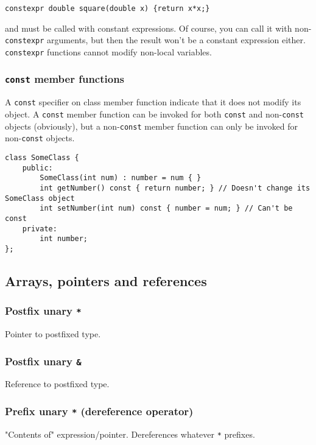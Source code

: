 \documentclass[8pt, table, xcdraw]{article}%
\begin{document}
\begin{lstlisting}
constexpr double square(double x) {return x*x;}
\end{lstlisting}

and must be called with constant expressions. Of course, you can call it with non-\lstinline{constexpr} arguments, but then the result won't be a constant expression either. \lstinline{constexpr} functions cannot modify non-local variables.

\subsubsection{\lstinline{const} member functions}

A \lstinline{const} specifier on class member function indicate that it does not modify its object. A \lstinline{const} member function can be invoked for both \lstinline{const} and non-\lstinline{const} objects (obviously), but a non-\lstinline{const} member function can only be invoked for non-\lstinline{const} objects.

\begin{lstlisting}
class SomeClass {
    public:
        SomeClass(int num) : number = num { }
        int getNumber() const { return number; } // Doesn't change its SomeClass object
        int setNumber(int num) const { number = num; } // Can't be const
    private:
        int number;
};
\end{lstlisting}

\subsection{Arrays, pointers and references}

\subsubsection{Postfix unary \lstinline{*}}
Pointer to postfixed type.

\subsubsection{Postfix unary \lstinline{&}}
Reference to postfixed type.

\subsubsection{Prefix unary \lstinline{*} (dereference operator)}
"Contents of" expression/pointer. Dereferences whatever \lstinline{*} prefixes.
\end{document}
